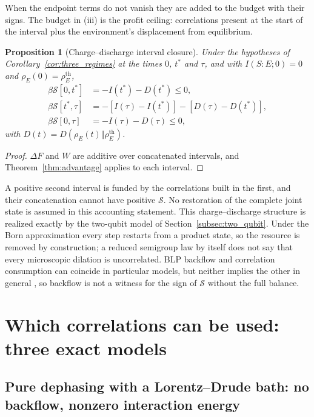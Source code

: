 \documentclass[12pt]{article}
\newtheorem{proposition}[theorem]{Proposition}
\begin{document}
When the endpoint terms do not vanish they are added to the budget with their signs. The budget in (iii) is the profit ceiling: correlations present at the start of the interval plus the environment's displacement from equilibrium.

\begin{proposition}[Charge--discharge interval closure]
\label{prop:full_cycle}
Under the hypotheses of Corollary~\ref{cor:three_regimes} at the times $0$, $t^*$ and $\tau$, and with $I(S{:}E;0)=0$ and $\rho_E(0)=\rho_E^{\mathrm{th}}$,
\begin{align*}
\beta\mathcal S[0,t^*]&=-I(t^*)-D(t^*)\le0,\\
\beta\mathcal S[t^*,\tau]&=-[I(\tau)-I(t^*)]-[D(\tau)-D(t^*)],\\
\beta\mathcal S[0,\tau]&=-I(\tau)-D(\tau)\le0,
\end{align*}
with $D(t)=D(\rho_E(t)\Vert\rho_E^{\mathrm{th}})$.
\end{proposition}

\begin{proof}
$\Delta F$ and $W$ are additive over concatenated intervals, and Theorem~\ref{thm:advantage} applies to each interval.
\end{proof}

A positive second interval is funded by the correlations built in the first, and their concatenation cannot have positive $\mathcal S$. No restoration of the complete joint state is assumed in this accounting statement. This charge--discharge structure is realized exactly by the two-qubit model of Section~\ref{subsec:two_qubit}. Under the Born approximation every step restarts from a product state, so the resource is removed by construction; a reduced semigroup law by itself does not say that every microscopic dilation is uncorrelated. BLP backflow and correlation consumption can coincide in particular models, but neither implies the other in general \cite{RivasHuelgaPlenio2014}, so backflow is not a witness for the sign of $\mathcal S$ without the full balance.

\section{Which correlations can be used: three exact models}
\label{sec:models}

\subsection{Pure dephasing with a Lorentz--Drude bath: no backflow, nonzero interaction energy}
\label{subsec:ld}
\end{document}
